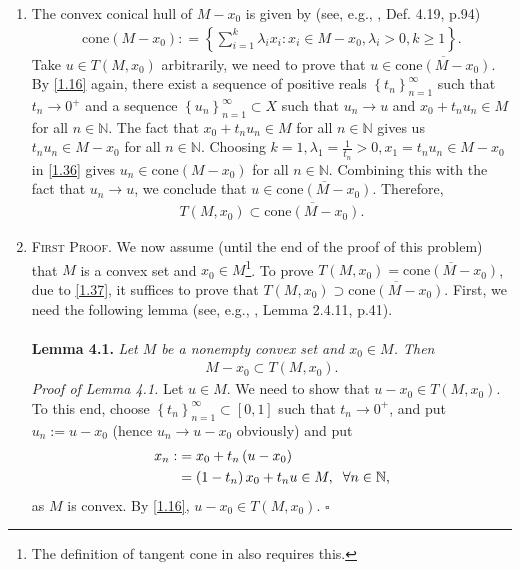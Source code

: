 \documentclass[a4paper]{article}
\numberwithin{equation}{section}
\begin{document}
\begin{enumerate}
\item The convex conical hull of $M-x_0$ is given by (see, e.g., \cite{1}, Def. 4.19, p.94)
\begin{align}
\label{1.36}
\mbox{cone}\left( {M - {x_0}} \right): = \left\{ {\sum\limits_{i = 1}^k {{\lambda _i}{x_i}} :{x_i} \in M - {x_0},{\lambda _i} > 0,k \ge 1} \right\}.
\end{align}
Take $u\in T\left(M,x_0\right)$ arbitrarily, we need to prove that $u \in \overline {\mbox{cone}\left( {M - {x_0}} \right)} $. By \eqref{1.16} again, there exist a sequence of positive reals $\left\{ {{t_n}} \right\}_{n = 1}^\infty $ such that $t_n \to 0^+$ and a sequence $\left\{ {{u_n}} \right\}_{n = 1}^\infty  \subset X$ such that $u_n\to u$ and $x_0+t_n u_n\in M$ for all $n\in \mathbb{N}$. The fact that $x_0+t_nu_n\in M$ for all $n\in \mathbb{N}$ gives us $t_nu_n\in M- {x_0}$ for all $n\in \mathbb{N}$. Choosing $k = 1,{\lambda _1} = \frac{1}{{{t_n}}} > 0,{x_1} = {t_n}{u_n} \in M - {x_0}$ in \eqref{1.36} gives ${u_n} \in \mbox{cone}\left( {M - {x_0}} \right)$ for all $n\in \mathbb{N}$. Combining this with the fact that $u_n\to u$, we conclude that $u \in \overline {\mbox{cone}\left( {M - {x_0}} \right)} $. Therefore,
\begin{align}
\label{1.37}
T\left( {M,{x_0}} \right) \subset \overline {\mbox{cone}\left( {M - {x_0}} \right)} .
\end{align}
\item \textsc{First Proof.} We now assume (until the end of the proof of this problem) that $M$ is a convex set and $x_0\in M$\footnote{The definition of tangent cone in \cite{1} also requires this.}. To prove $T\left( {M,{x_0}} \right) = \overline {\mbox{cone}\left( {M - {x_0}} \right)} $, due to \eqref{1.37}, it suffices to prove that $T\left( {M,{x_0}} \right) \supset \overline {\mbox{cone}\left( {M - {x_0}} \right)} $. First, we need the following lemma (see, e.g., \cite{2}, Lemma 2.4.11, p.41).\\
\\
\textbf{Lemma 4.1.} \textit{Let $M$ be a nonempty convex set and $x_0\in M$. Then}
\begin{align}
M - {x_0} \subset T\left( {M,{x_0}} \right).
\end{align}
\textit{Proof of Lemma 4.1.} Let $u \in M$. We need to show that $u-{x_0} \in T\left(M,x_0\right)$. To this end, choose $\left\{ {{t_n}} \right\}_{n = 1}^\infty  \subset \left[ {0,1} \right]$ such that $t_n\to 0^+$, and put $u_n:=u-x_0$ (hence $u_n\to u-x_0$ obviously) and put
\begin{align}
{x_n}: &= {x_0} + {t_n}\left( {u - {x_0}} \right)\\
 &= \left( {1 - {t_n}} \right){x_0} + {t_n}u \in M ,\hspace{0.2cm} \forall n\in \mathbb{N},
\end{align}
as $M$ is convex. By \eqref{1.16}, $u-{x_0}\in T\left(M,x_0\right)$. \hfill $\square$\\


\end{enumerate}
\end{document}
